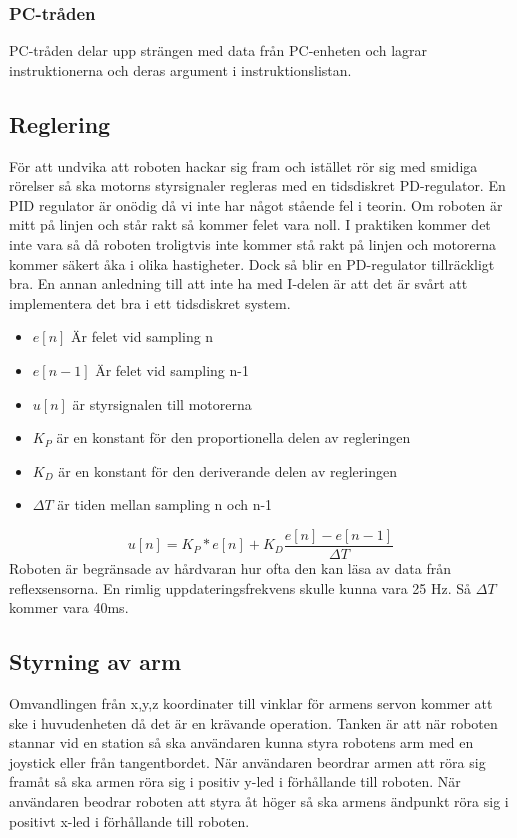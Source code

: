 \subsubsection{PC-tråden}
PC-tråden delar upp strängen med data från PC-enheten och lagrar instruktionerna och deras argument i instruktionslistan.

\subsection{Reglering}
För att undvika att roboten hackar sig fram och istället rör sig med smidiga rörelser så ska motorns styrsignaler regleras med en tidsdiskret PD-regulator. En PID regulator är onödig då vi inte har något stående fel i teorin. Om roboten är mitt på linjen och står rakt så kommer felet vara noll. I praktiken kommer det inte vara så då roboten troligtvis inte kommer stå rakt på linjen och motorerna kommer säkert åka i olika hastigheter. Dock så blir en PD-regulator tillräckligt bra. En annan anledning till att inte ha med I-delen är att det är svårt att implementera det bra i ett tidsdiskret system. 
\begin{itemize}
\item $e[n]$ Är felet vid sampling n
\item $e[n-1]$ Är felet vid sampling n-1
\item $u[n]$ är styrsignalen till motorerna
\item $K_{P}$ är en konstant för den proportionella delen av regleringen
\item $K_{D}$ är en konstant för den deriverande delen av regleringen
\item $\Delta T$ är tiden mellan sampling n och n-1
 
\end{itemize}
 $$ u[n] = K_P*e[n] + K_D\frac{e[n]-e[n-1]}{\Delta T}$$
 Roboten är begränsade av hårdvaran hur ofta den kan läsa av data från reflexsensorna. En rimlig uppdateringsfrekvens skulle kunna vara 25 Hz\cite{handledare}. Så $\Delta T$ kommer vara 40ms.

 \subsection{Styrning av arm}
 Omvandlingen från x,y,z koordinater till vinklar för armens servon kommer att ske i huvudenheten då det är en krävande operation. Tanken är att när roboten stannar vid en station så ska användaren kunna styra robotens arm med en joystick eller från tangentbordet. När användaren beordrar armen att röra sig framåt så ska armen röra sig i positiv y-led i förhållande till roboten. När användaren beodrar roboten att styra åt höger så ska armens ändpunkt röra sig i positivt x-led i förhållande till roboten.
 \newline

